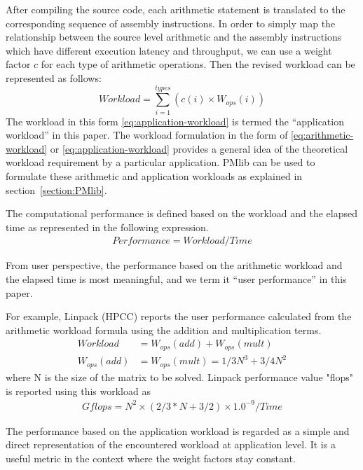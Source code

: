 \documentclass[conference]{IEEEtran}
\begin{document}
After compiling the source code, each arithmetic statement is translated to
the corresponding sequence of assembly instructions.
In order to simply map the relationship between the source level arithmetic
and the assembly instructions which have different
execution latency and throughput,
we can use a weight factor $ c $ for each type of arithmetic operations.
Then the revised workload can be represented as follows:
\begin{equation}\label{eq:application-workload}
		Workload = \sum_{i=1}^{types} \left(c(i)\times W_{ops}(i)\right)
\end{equation}
%
The workload in this form \eqref{eq:application-workload}
is termed the ``application workload'' in this paper.
The workload formulation in the form of
\eqref{eq:arithmetic-workload}
or
\eqref{eq:application-workload}
provides a general idea of the theoretical workload requirement by
a particular application.
PMlib can be used to formulate these arithmetic and application workloads
as explained in section~\ref{section:PMlib}.


The computational performance is defined based on the workload and
the elapsed time as represented in the following expression.
\begin{align}\label{eq:performance-workload-time}
Performance = Workload / Time 
\end{align}

From user perspective, the performance based on the arithmetic workload
and the elapsed time is most meaningful,
and we term it ``user performance'' in this paper.

For example, Linpack (HPCC)%
reports the user performance calculated from the arithmetic workload formula
using the addition and multiplication terms.
\begin{align}
		Workload & = W_{ops}(add) + W_{ops}(mult) \\
		W_{ops}(add) & = W_{ops}(mult) = 1/3 N^{3} + 3/4 N^{2}
\end{align}
where N is the size of the matrix to be solved.
Linpack performance value "flops" is reported using this workload as
\begin{align*}
Gflops = N^{2} \times ( 2/3 * N + 3/2 ) \times 1.0^{-9} / Time 
\end{align*}

%
The performance based on the application workload is regarded as a simple
and direct representation of the encountered workload at application level.
It is a useful metric in the context where the weight factors stay constant.
\end{document}
